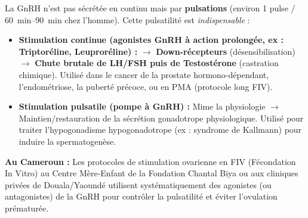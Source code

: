 \documentclass[11pt]{article}
\begin{document}
\begin{savaistu}
La GnRH n'est pas sécrétée en continu mais par \textbf{pulsations} (environ 1 pulse / \SI{60}{\minute}--\SI{90}{\minute} chez l'homme). Cette pulsatilité est \emph{indispensable} :
\begin{itemize}
    \item \textbf{Stimulation continue (agonistes GnRH à action prolongée, ex : Triptoréline, Leuproréline) :} $\rightarrow$ \textbf{Down-récepteurs} (désensibilisation) $\rightarrow$ \textbf{Chute brutale de LH/FSH puis de Testostérone} (castration chimique). Utilisé dans le cancer de la prostate hormono-dépendant, l'endométriose, la puberté précoce, ou en PMA (protocole long FIV).
    \item \textbf{Stimulation pulsatile (pompe à GnRH) :} Mime la physiologie $\rightarrow$ Maintien/restauration de la sécrétion gonadotrope physiologique. Utilisé pour traiter l'hypogonadisme hypogonadotrope (ex : syndrome de Kallmann) pour induire la spermatogenèse.
\end{itemize}
\textbf{Au Cameroun :} Les protocoles de stimulation ovarienne en FIV (Fécondation In Vitro) au Centre Mère-Enfant de la Fondation Chantal Biya ou aux cliniques privées de Douala/Yaoundé utilisent systématiquement des agonistes (ou antagonistes) de la GnRH pour contrôler la pulsatilité et éviter l'ovulation prématurée.
\end{savaistu}
\end{document}
